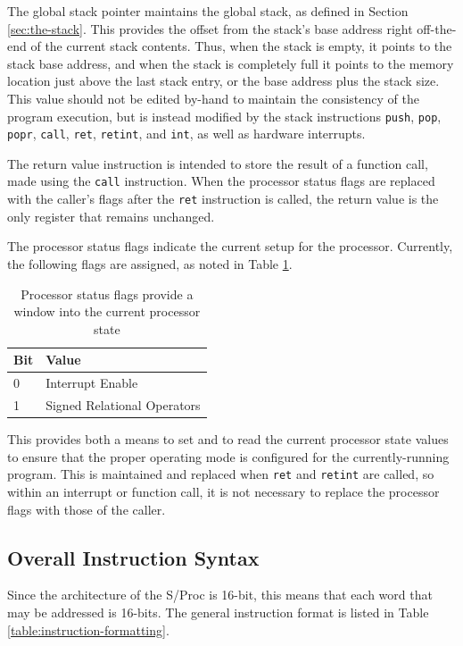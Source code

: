 \documentclass{article}
\begin{document}
The global stack pointer maintains the global stack, as defined in Section \ref{sec:the-stack}. This provides the offset from the stack's base address right off-the-end of the current stack contents. Thus, when the stack is empty, it points to the stack base address, and when the stack is completely full it points to the memory location just above the last stack entry, or the base address plus the stack size. This value should not be edited by-hand to maintain the consistency of the program execution, but is instead modified by the stack instructions \texttt{push}, \texttt{pop}, \texttt{popr}, \texttt{call}, \texttt{ret}, \texttt{retint}, and \texttt{int}, as well as hardware interrupts.

The return value instruction is intended to store the result of a function call, made using the \texttt{call} instruction. When the processor status flags are replaced with the caller's flags after the \texttt{ret} instruction is called, the return value is the only register that remains unchanged.

The processor status flags indicate the current setup for the processor. Currently, the following flags are assigned, as noted in Table \ref{table:processor-flags}.

\begin{table}[h!]
	\centering
	\begin{tabular}{l|l}
		\hline
		Bit & Value \\
		\hline
		0 & Interrupt Enable \\
		1 & Signed Relational Operators \\
		\hline
	\end{tabular}
	\caption{Processor status flags provide a window into the current processor state}
	\label{table:processor-flags}
 \end{table}

This provides both a means to set and to read the current processor state values to ensure that the proper operating mode is configured for the currently-running program. This is maintained and replaced when \texttt{ret} and \texttt{retint} are called, so within an interrupt or function call, it is not necessary to replace the processor flags with those of the caller.

\subsection{Overall Instruction Syntax}

Since the architecture of the S/Proc is 16-bit, this means that each word that may be addressed is 16-bits. The general instruction format is listed  in Table \ref{table:instruction-formatting}.
\end{document}

